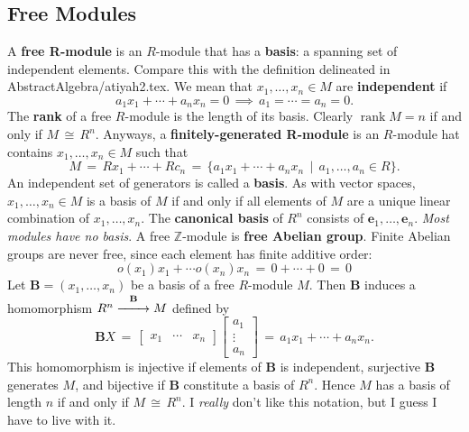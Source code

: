\documentclass[11pt]{article}
\renewcommand{\longrightarrow}{\xrightarrow{\hspace*{0.7cm}}}
\renewcommand{\vec}[1]{\mathbf{#1}}
\begin{document}

\subsection{Free Modules}

A \textbf{free R-module} is an $R$-module that has a \textbf{basis}: a spanning set of independent elements. Compare this with the definition delineated in AbstractAlgebra/atiyah2.tex. We mean that $x_{1}, \ldots, x_{n} \in M$ are \textbf{independent} if
\[
  a_{1} x_{1} + \cdots + a_{n} x_{n} = 0 \, \implies \, a_{1} = \cdots = a_{n} = 0.
\]
The \textbf{rank} of a free $R$-module is the length of its basis. Clearly $\operatorname{rank} M = n$ if and only if $M \, \cong \, R^{n}$. Anyways, a \textbf{finitely-generated R-module} is an $R$-module hat contains $x_{1}, \ldots, x_{n} \in M$ such that
\[
  M \, = \, R x_{1} + \cdots + R c_{n} \, = \, \{ a_{1}x_{1} + \cdots + a_{n}x_{n} \, \mid \, a_{1}, \ldots, a_{n} \in R \}.
\]
An independent set of generators is called a \textbf{basis}. As with vector spaces, $x_{1}, \ldots, x_{n} \in M$ is a basis of $M$ if and only if all elements of $M$ are a unique linear combination of $x_{1}, \ldots, x_{n}$. The \textbf{canonical basis} of $R^{n}$ consists of $\vec{e}_{1}, \ldots, \vec{e}_{n}$.
\newpage
\textit{Most modules have no basis}. A free $\mathbb{Z}$-module is \textbf{free Abelian group}. Finite Abelian groups are never free, since each element has finite additive order:
\[
  o(x_{1}) x_{1} + \cdots o(x_{n}) x_{n} \, = \, 0 + \cdots + 0 \, = \, 0
\]
Let $\vec{B} = (x_{1}, \ldots, x_{n})$ be a basis of a free $R$-module $M$. Then $\vec{B}$ induces a homomorphism $R^{n} \stackrel{\vec{B}}{\longrightarrow} M$ defined by
\[
  \vec{B}X \, = \, \begin{bmatrix} x_{1} & \cdots & x_{n} \end{bmatrix} \begin{bmatrix} a_{1} \\ \vdots \\ a_{n} \end{bmatrix} \, = \, a_{1}x_{1} + \cdots + a_{n}x_{n}.
\]
This homomorphism is injective if elements of $\vec{B}$ is independent, surjective $\vec{B}$ generates $M$, and bijective if $\vec{B}$ constitute a basis of $R^{n}$. Hence $M$ has a basis of length $n$ if and only if $M \, \cong \, R^{n}$. I \textit{really} don't like this notation, but I guess I have to live with it.

\end{document}
